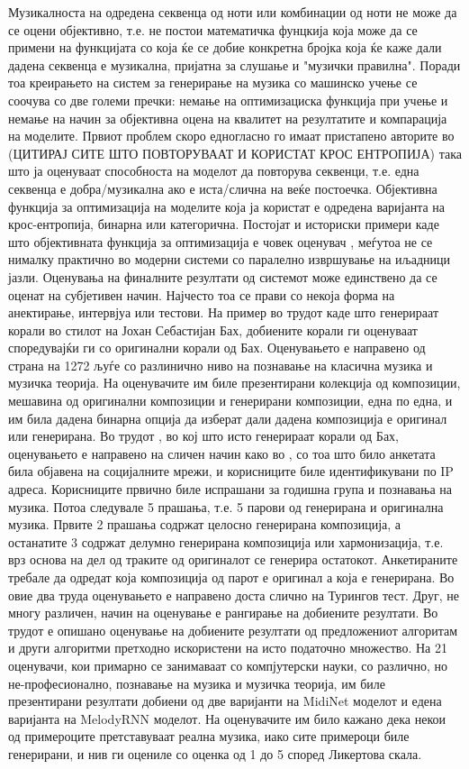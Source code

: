 Музикалноста на одредена секвенца од ноти или комбинации од ноти не може да се оцени објективно, т.е. не постои математичка фунцкија која може да се примени на функцијата со која ќе се добие конкретна бројка која ќе каже дали дадена секвенца е музикална, пријатна за слушање и "музички правилна". Поради тоа креирањето на систем за генерирање на музика со машинско учење се соочува со две големи пречки: немање на оптимизациска функција при учење и немање на начин за објективна оцена на квалитет на резултатите и компарација на моделите. 
Првиот проблем скоро едногласно го имаат пристапено авторите во (ЦИТИРАЈ СИТЕ ШТО ПОВТОРУВААТ И КОРИСТАТ КРОС ЕНТРОПИЈА) така што ја оценуваат способноста на моделот да повторува секвенци, т.е. една секвенца е добра/музикална ако е иста/слична на веќе постоечка. Објективна функција за оптимизација на моделите која ја користат е одредена варијанта на крос-ентропија, бинарна или категорична. Постојат и историски примери каде што објективната функција за оптимизација е човек оценувач \cite{Biles1994}, меѓутоа не се нималку практично во модерни системи со паралелно извршување на иљадници јазли.
Оценувања на финалните резултати од системот може единствено да се оценат на субјетивен начин. Најчесто тоа се прави со некоја форма на анектирање, интервјуа или тестови. На пример во трудот \cite{Hadjeres2016} каде што генерираат корали во стилот на Јохан Себастијан Бах, добиените корали ги оценуваат споредувајќи ги со оригинални корали од Бах. Оценувањето е направено од страна на 1272 љуѓе со разлинично ниво на познавање на класична музика и музичка теорија. На оценувачите им биле презентирани колекција од композиции, мешавина од оригинални композиции и генерирани композиции, една по една, и им била дадена бинарна опција да изберат дали дадена композиција е оригинал или генерирана.
Во трудот \cite{Liang2017}, во кој што исто генерираат корали од Бах, оценувањето е направено на сличен начин како во \cite{Hadjeres2016}, со тоа што било анкетата била објавена на социјалните мрежи, и корисниците биле идентификувани по IP адреса. Корисниците првично биле испрашани за годишна група и познавања на музика. Потоа следувале 5 прашања, т.е. 5 парови од генерирана и оригинална музика. Првите 2 прашања содржат целосно генерирана композиција, а останатите 3 содржат делумно генерирана композиција или хармонизација, т.е. врз основа на дел од траките од оригиналот се генерира остатокот. Анкетираните требале да одредат која композиција од парот е оригинал а која е генерирана.
Во овие два труда оценувањето е направено доста слично на Турингов тест. Друг, не многу различен, начин на оценување е рангирање на добиените резултати. Во трудот \cite{Yang2017} е опишано оценување на добиените резултати од предложениот алгоритам и други алгоритми претходно искористени на исто податочно множество. На 21 оценувачи, кои примарно се занимаваат со компјутерски науки, со различно, но не-професионално, познавање на музика и музичка теорија, им биле презентирани резултати добиени од две варијанти на MidiNet моделот и едена варијанта на MelodyRNN моделот. На оценувачите им било кажано дека некои од примероците претставуваат реална музика, иако сите примероци биле генерирани, и нив ги оцениле со оценка од 1 до 5 според Ликертова скала.
